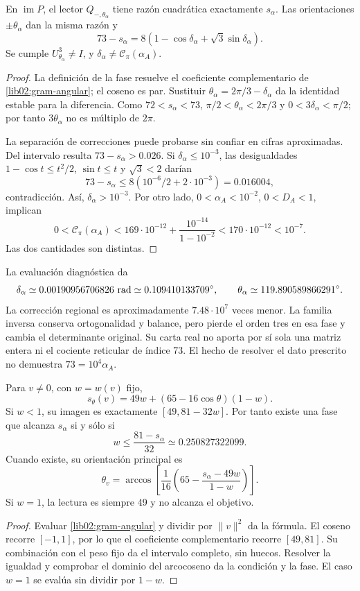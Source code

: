 \begin{corollary}
\label{lib02:fase-alpha}
En \(\operatorname{im}P\), el lector
\(Q_{-,\theta_\alpha}\) tiene razón cuadrática exactamente
\(s_\alpha\). Las orientaciones \(\pm\theta_\alpha\) dan la
misma razón y
\[
 73-s_\alpha
 =8(1-\cos\delta_\alpha+\sqrt3\sin\delta_\alpha).
\]
Se cumple \(U_{\theta_\alpha}^3\ne I\), y
\(\delta_\alpha\ne\mathcal C_\pi(\alpha_A)\).
\end{corollary}
\begin{proof}
La definición de la fase resuelve el coeficiente complementario de
\eqref{lib02:gram-angular}; el coseno es par. Sustituir
\(\theta_\alpha=2\pi/3-\delta_\alpha\) da la identidad estable
para la diferencia. Como \(72<s_\alpha<73\),
\(\pi/2<\theta_\alpha<2\pi/3\) y
\(0<3\delta_\alpha<\pi/2\); por tanto \(3\theta_\alpha\)
no es múltiplo de \(2\pi\).

La separación de correcciones puede probarse sin confiar en cifras
aproximadas. Del intervalo resulta \(73-s_\alpha>0.026\).
Si \(\delta_\alpha\leq10^{-3}\), las desigualdades
\(1-\cos t\leq t^2/2\), \(\sin t\leq t\) y
\(\sqrt3<2\) darían
\[
 73-s_\alpha\leq8(10^{-6}/2+2\cdot10^{-3})=0.016004,
\]
contradicción. Así, \(\delta_\alpha>10^{-3}\). Por otro lado,
\(0<\alpha_A<10^{-2}\), \(0<D_A<1\), implican
\[
 0<\mathcal C_\pi(\alpha_A)
 <169\cdot10^{-12}+\frac{10^{-14}}{1-10^{-2}}
 <170\cdot10^{-12}<10^{-7}.
\]
Las dos cantidades son distintas.
\end{proof}

La evaluación diagnóstica da
\[
 \delta_\alpha\simeq0.00190956706826\ {\rm rad}
 \simeq0.109410133709^\circ,\qquad
 \theta_\alpha\simeq119.890589866291^\circ.
\]
La corrección regional es aproximadamente \(7.48\cdot10^7\) veces
menor. La familia inversa conserva ortogonalidad y balance, pero pierde
el orden tres en esa fase y cambia el determinante original. Su carta
real no aporta por sí sola una matriz entera ni el cociente reticular de
índice 73. El hecho de resolver el dato prescrito no demuestra
\(73=10^4\alpha_A\).

\begin{proposition}
\label{lib02:alcanzabilidad}
Para \(v\ne0\), con \(w=w(v)\) fijo,
\[
 s_\theta(v)=49w+(65-16\cos\theta)(1-w).
\]
Si \(w<1\), su imagen es exactamente
\([49,81-32w]\). Por tanto existe una fase que alcanza
\(s_\alpha\) si y sólo si
\[
 w\leq\frac{81-s_\alpha}{32}\simeq0.250827322099.
\]
Cuando existe, su orientación principal es
\[
 \theta_v=\arccos\left[
 \frac1{16}\left(65-\frac{s_\alpha-49w}{1-w}\right)\right].
\]
Si \(w=1\), la lectura es siempre 49 y no alcanza el objetivo.
\end{proposition}
\begin{proof}
Evaluar \eqref{lib02:gram-angular} y dividir por \(\|v\|^2\)
da la fórmula. El coseno recorre \([-1,1]\), por lo que el
coeficiente complementario recorre \([49,81]\). Su combinación con
el peso fijo da el intervalo completo, sin huecos. Resolver la igualdad
y comprobar el dominio del arcocoseno da la condición y la fase.
El caso \(w=1\) se evalúa sin dividir por \(1-w\).
\end{proof}

